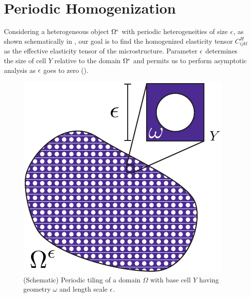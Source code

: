 \documentclass[twocolumn,10pt]{article}
\begin{document}
\section{Periodic Homogenization\label{sec:homogen}}
Considering a heterogeneous object $\Omega^\epsilon$ with periodic
heterogeneities of size $\epsilon$, as shown schematically in
, our goal is to find the homogenized elasticity
tensor $C^H_{ijkl}$ as the effective elasticity tensor of the
microstructure. Parameter $\epsilon$ determines the size of cell $Y$
relative to the domain $\Omega^\epsilon$ and permits us to perform
asymptotic analysis as $\epsilon$ goes to zero ().
\begin{figure}[!hbt]
    \centering
    \includegraphics[width=.28\textwidth]{Images/periodic.pdf}
    \caption{(Schematic) Periodic tiling of a domain $\Omega$ with
      base cell $Y$ having geometry $\omega$ and length scale $\epsilon$.}
    \label{fig:periodic}
\end{figure}
\end{document}
